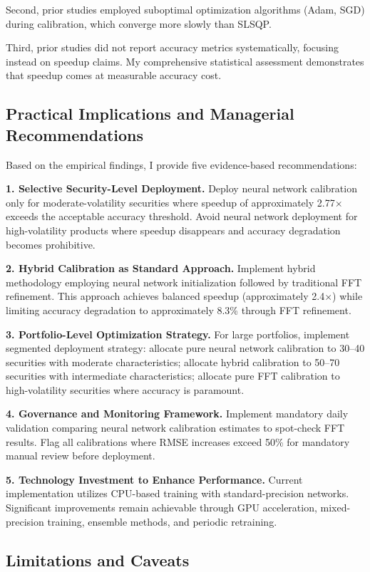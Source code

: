 \documentclass[12pt,a4paper]{article}
\begin{document}
Second, prior studies employed suboptimal optimization algorithms (Adam, SGD) during calibration, which converge more slowly than SLSQP.

Third, prior studies did not report accuracy metrics systematically, focusing instead on speedup claims. My comprehensive statistical assessment demonstrates that speedup comes at measurable accuracy cost.

\subsection{Practical Implications and Managerial Recommendations}

Based on the empirical findings, I provide five evidence-based recommendations:

\textbf{1. Selective Security-Level Deployment.} Deploy neural network calibration only for moderate-volatility securities where speedup of approximately 2.77$\times$ exceeds the acceptable accuracy threshold. Avoid neural network deployment for high-volatility products where speedup disappears and accuracy degradation becomes prohibitive.

\textbf{2. Hybrid Calibration as Standard Approach.} Implement hybrid methodology employing neural network initialization followed by traditional FFT refinement. This approach achieves balanced speedup (approximately 2.4$\times$) while limiting accuracy degradation to approximately 8.3\% through FFT refinement.

\textbf{3. Portfolio-Level Optimization Strategy.} For large portfolios, implement segmented deployment strategy: allocate pure neural network calibration to 30--40 securities with moderate characteristics; allocate hybrid calibration to 50--70 securities with intermediate characteristics; allocate pure FFT calibration to high-volatility securities where accuracy is paramount.

\textbf{4. Governance and Monitoring Framework.} Implement mandatory daily validation comparing neural network calibration estimates to spot-check FFT results. Flag all calibrations where RMSE increases exceed 50\% for mandatory manual review before deployment.

\textbf{5. Technology Investment to Enhance Performance.} Current implementation utilizes CPU-based training with standard-precision networks. Significant improvements remain achievable through GPU acceleration, mixed-precision training, ensemble methods, and periodic retraining.

\subsection{Limitations and Caveats}
\end{document}
